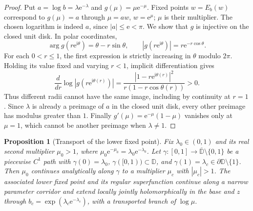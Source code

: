 \documentclass[11pt]{amsart}
\newtheorem{proposition}[theorem]{Proposition}
\theoremstyle{definition}
\newcommand{\eee}{\mathrm{e}}
\newcommand{\ii}{\mathrm{i}}
\begin{document}
\begin{proof}
Put $a=\log b=\lambda\eee^{-\lambda}$ and
$g(\mu)=\mu\eee^{-\mu}$.  Fixed points $w=E_b(w)$ correspond to
$g(\mu)=a$ through $\mu=aw$, $w=\eee^\mu$; $\mu$ is their multiplier.
The chosen logarithm is indeed $a$, since $|a|\le\eee<\pi$.
We show that $g$ is injective on the closed unit disk.  In polar
coordinates,
\[
 \arg g(r\eee^{\ii\theta})=\theta-r\sin\theta,\qquad
 |g(r\eee^{\ii\theta})|=r\eee^{-r\cos\theta}.
\]
For each $0<r\le1$, the first expression is strictly increasing in
$\theta$ modulo $2\pi$.  Holding its value fixed and varying $r<1$,
implicit differentiation gives
\[
 \frac{d}{dr}\log|g(r\eee^{\ii\theta(r)})|
 =\frac{|1-r\eee^{\ii\theta(r)}|^2}
        {r(1-r\cos\theta(r))}>0.
\]
Thus different radii cannot have the same image, including by
continuity at $r=1$.  Since $\lambda$ is already a preimage of $a$ in
the closed unit disk, every other preimage has modulus greater than $1$.
Finally $g'(\mu)=\eee^{-\mu}(1-\mu)$ vanishes only at $\mu=1$,
which cannot be another preimage when $\lambda\ne1$.
\end{proof}

\begin{proposition}[Transport of the lower fixed point]
\label{prop:lower-transport}
Fix $\lambda_0\in(0,1)$ and its real second multiplier $\mu_0>1$,
where $\mu_0\eee^{-\mu_0}=\lambda_0\eee^{-\lambda_0}$.
Let $\gamma:[0,1]\to\overline{\mathbb D}\setminus\{0,1\}$ be a
piecewise $C^1$ path with $\gamma(0)=\lambda_0$,
$\gamma([0,1))\subset\mathbb D$, and
$\gamma(1)=\lambda_c\in\partial\mathbb D\setminus\{1\}$.
Then $\mu_0$ continues analytically along $\gamma$ to a multiplier
$\mu_c$ with $|\mu_c|>1$.  The associated lower fixed point and its
regular superfunction continue along a narrow parameter corridor and
extend locally jointly holomorphically in the base and $z$ through
$b_c=\exp(\lambda_c\eee^{-\lambda_c})$, with a transported branch of
$\log\mu$.
\end{proposition}
\end{document}
